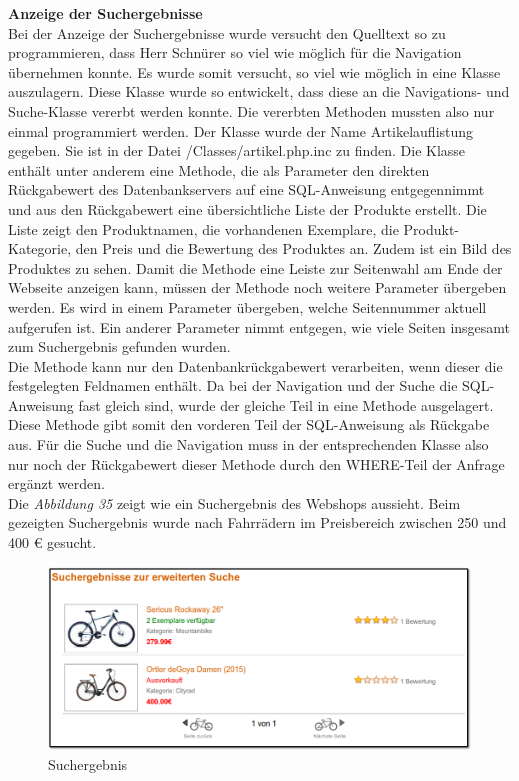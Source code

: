 \textbf{Anzeige der Suchergebnisse}\\
Bei der Anzeige der Suchergebnisse wurde versucht den Quelltext so zu programmieren, dass Herr Schnürer so viel wie möglich für die Navigation übernehmen konnte. Es wurde somit versucht, so viel wie möglich in eine Klasse auszulagern. Diese Klasse wurde so entwickelt, dass diese an die Navigations- und Suche-Klasse vererbt werden konnte. Die vererbten Methoden mussten also nur einmal programmiert werden. Der Klasse wurde der Name \glqq Artikelauflistung\grqq{} gegeben. Sie ist in der Datei \glqq /Classes/artikel.php.inc\grqq{} zu finden. Die Klasse enthält unter anderem eine Methode, die als Parameter den direkten Rückgabewert des Datenbankservers auf eine SQL-Anweisung entgegennimmt und aus den Rückgabewert eine übersichtliche Liste der Produkte erstellt. Die Liste zeigt den Produktnamen, die vorhandenen Exemplare, die Produkt-Kategorie, den Preis und die Bewertung des Produktes an. Zudem ist ein Bild des Produktes zu sehen. Damit die Methode eine Leiste zur Seitenwahl am Ende der Webseite anzeigen kann, müssen der Methode noch weitere Parameter übergeben werden. Es wird in einem Parameter übergeben, welche Seitennummer aktuell aufgerufen ist. Ein anderer Parameter nimmt entgegen, wie viele Seiten insgesamt zum Suchergebnis gefunden wurden. \\
Die Methode kann nur den Datenbankrückgabewert verarbeiten, wenn dieser die festgelegten Feldnamen enthält. Da bei der Navigation und der Suche die SQL-Anweisung fast gleich sind, wurde der gleiche Teil in eine Methode ausgelagert. Diese Methode gibt somit den vorderen Teil der SQL-Anweisung als Rückgabe aus. Für die Suche und die Navigation muss in der entsprechenden Klasse also nur noch der Rückgabewert dieser Methode durch den \glqq WHERE-Teil \grqq{} der Anfrage ergänzt werden.\\
Die \textit{Abbildung 35} zeigt wie ein Suchergebnis des Webshops aussieht. Beim gezeigten Suchergebnis wurde nach Fahrrädern im Preisbereich zwischen 250 und 400 € gesucht.

\begin{figure}[H]
	\begin{center}
			\includegraphics[width=130mm]{Bilder/suchergebnis.png}
	\end{center}
	\caption{Suchergebnis}
\end{figure}

